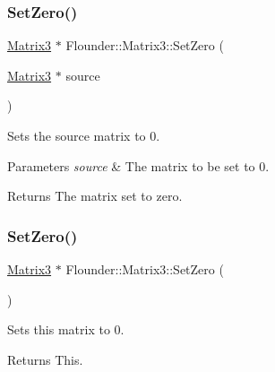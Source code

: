 \subsubsection{\texorpdfstring{Set\+Zero()}{SetZero()}\hspace{0.1cm}{\footnotesize\ttfamily [1/2]}}
{\footnotesize\ttfamily \hyperlink{class_flounder_1_1_matrix3}{Matrix3} $\ast$ Flounder\+::\+Matrix3\+::\+Set\+Zero (\begin{DoxyParamCaption}\item[{\hyperlink{class_flounder_1_1_matrix3}{Matrix3} $\ast$}]{source }\end{DoxyParamCaption})\hspace{0.3cm}{\ttfamily [static]}}



Sets the source matrix to 0. 


\begin{DoxyParams}{Parameters}
{\em source} & The matrix to be set to 0. \\
\hline
\end{DoxyParams}
\begin{DoxyReturn}{Returns}
The matrix set to zero. 
\end{DoxyReturn}
\mbox{\label{class_flounder_1_1_matrix3_a9de63d832e809ecac5b97c3cea038598}} 
\subsubsection{\texorpdfstring{Set\+Zero()}{SetZero()}\hspace{0.1cm}{\footnotesize\ttfamily [2/2]}}
{\footnotesize\ttfamily \hyperlink{class_flounder_1_1_matrix3}{Matrix3} $\ast$ Flounder\+::\+Matrix3\+::\+Set\+Zero (\begin{DoxyParamCaption}{ }\end{DoxyParamCaption})}



Sets this matrix to 0. 

\begin{DoxyReturn}{Returns}
This. 
\end{DoxyReturn}
\mbox{\label{class_flounder_1_1_matrix3_aad026f1d41ae3d78b008c362febb6512}} 
